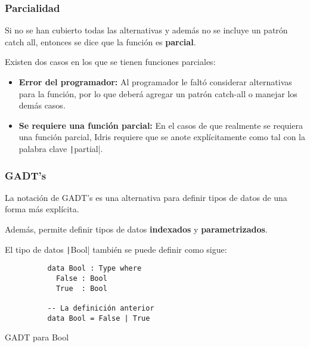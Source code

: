 \documentclass{beamer}
\begin{document}
\begin{frame}[fragile]
  \frametitle{Parcialidad}

  Si no se han cubierto todas las alternativas y además no se incluye un patrón catch
  all, entonces se dice que la función es \textbf{parcial}.

  Existen dos casos en los que se tienen funciones parciales:
  \begin{itemize}
    \item \textbf{Error del programador:} Al programador le faltó considerar alternativas
      para la función, por lo que deberá agregar un patrón catch-all o manejar los demás
      casos.
    \item \textbf{Se requiere una función parcial:} En el casos de que realmente se
      requiera una función parcial, Idris requiere que se anote explícitamente como tal
      con la palabra clave \texttt|partial|.
  \end{itemize}

\end{frame}

\begin{frame}[fragile]
  \frametitle{GADT's}

  La notación de GADT's es una alternativa para definir tipos de datos de una forma más
  explícita.

  Además, permite definir tipos de datos \textbf{indexados} y \textbf{parametrizados}.

  El tipo de datos \texttt|Bool| también se puede definir como sigue:

  \begin{listing}[H]
    \begin{center}
      \begin{minipage}{0.42\textwidth}
          \begin{verbatim}
          data Bool : Type where
            False : Bool
            True  : Bool

          -- La definición anterior
          data Bool = False | True
          \end{verbatim}
      \end{minipage}
    \end{center}
    \caption{GADT para Bool}
    \label{lst:catchalltotal}
  \end{listing}
\end{frame}
\end{document}
